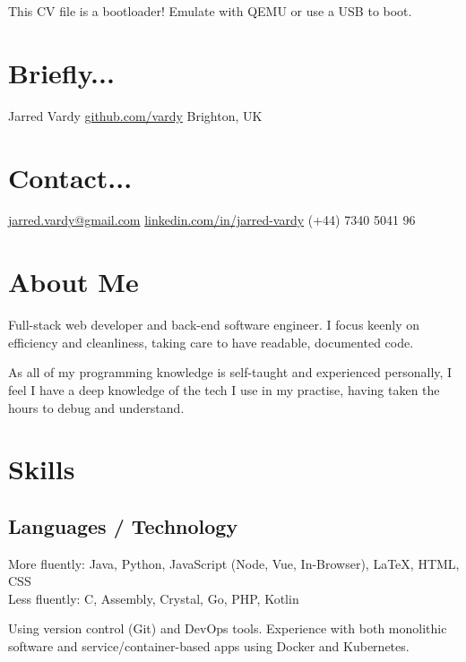 \documentclass[]{jvcv}
\begin{document}
       {This CV file is a bootloader! Emulate with QEMU or use a USB to boot.}


%
\begin{aside}
	\section{Briefly...}\vspace{0.1cm}
	Jarred Vardy
	\hyperref[https://github.com/vardy/]{github.com/vardy}
	Brighton, UK
	\section{Contact...}\vspace{0.1cm}
	\hyperref[mailto:jarred.vardy@gmail.com]{jarred.vardy@gmail.com}
	\hyperref[https://linkedin.com/in/jarred-vardy]{linkedin.com/in/jarred-vardy}
	(+44) 7340 5041 96
\end{aside}

%
\section{About Me}
Full-stack web developer and back-end software engineer.
I focus keenly on efficiency and cleanliness, taking care to have readable, documented code.

As all of my programming knowledge is self-taught and experienced personally, I feel I have a
deep knowledge of the tech I use in my practise, having taken the hours to debug and understand.

%
\vspace{0.5cm}
\section{Skills}
\subsection{Languages / Technology}
More fluently: Java, Python, JavaScript (Node, Vue, In-Browser), LaTeX, HTML, CSS\\
Less fluently: C, Assembly, Crystal, Go, PHP, Kotlin

Using version control (Git) and DevOps tools. Experience with both monolithic software 
and service/container-based apps using Docker and Kubernetes.
\end{document}
